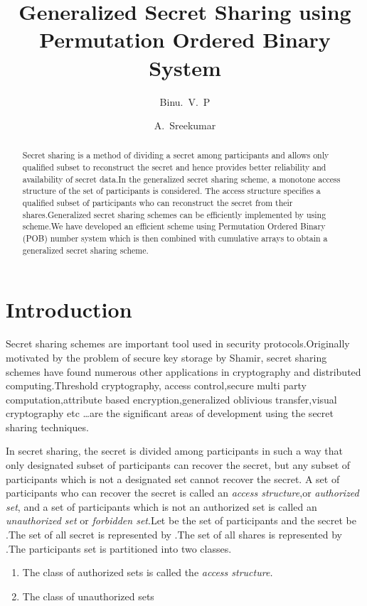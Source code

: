 \documentclass{llncs}
\title{Generalized Secret Sharing using Permutation Ordered Binary System}
\author{Binu.~V.~P\inst{1} \and A.~Sreekumar\inst{1}}
\institute{Cochin University of Science and Technology, Cochin 22, India}
\begin{document}
\maketitle
\begin{abstract}
Secret sharing is a method of dividing a secret among  participants and allows only qualified subset to reconstruct the secret and hence provides better reliability and availability of secret data.In the generalized secret sharing scheme, a monotone access structure of the set of participants is considered. The access structure specifies a qualified subset of participants who can  reconstruct the secret from their shares.Generalized secret sharing schemes can be efficiently implemented by using  scheme.We have developed an efficient  scheme using  Permutation Ordered Binary (POB) number system which is then combined with cumulative arrays to obtain a generalized secret sharing scheme.
\end{abstract}
\section{Introduction}

Secret sharing schemes are important tool used in security protocols.Originally motivated by the problem of secure key storage by Shamir\cite{shamir1979}, secret sharing schemes have found numerous other applications in cryptography and distributed computing.Threshold cryptography\cite{desmedt1992shared}, access control\cite{naor1998access},secure multi party computation\cite{ben1988completeness}\cite{chaum1988multiparty}\cite{cramer2000general},attribute based encryption\cite{goyal2006attribute}\cite{bethencourt2007ciphertext},generalized oblivious transfer\cite{tassa2011generalized}\cite{shankar2008alternative},visual cryptography \cite{naor1995visual} etc \ldots are the significant areas of development using the secret sharing techniques.

In secret sharing, the secret is divided among  participants in such a way that only designated subset of participants can recover the secret, but any subset of participants which is not a designated set cannot recover the secret.
A set of participants who can recover the secret is called an \textit{access structure},or \textit{authorized set}, and a set of participants which is not an authorized set is called an \textit{unauthorized set} or \textit{forbidden set}.Let  be the set of participants and the secret be  .The set of all secret is represented by .The set of all shares  is represented by .The participants set is partitioned into two classes.\\
\begin{enumerate}
\item The class of authorized sets  is called the \textit{access structure.}
\item The class of unauthorized sets 
\end{enumerate}
\end{document}
